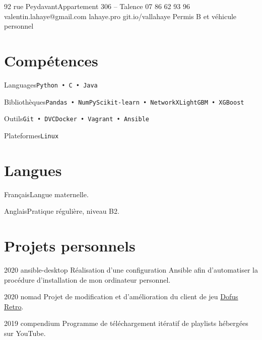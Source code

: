 \documentclass{tccv}
\begin{document}
\personal
    {92 rue Peydavant\newline Appartement 306 -- Talence}
    {07 86 62 93 96}
    {valentin.lahaye@gmail.com}
    {lahaye.pro}
    {git.io/vallahaye}
    {Permis B et véhicule personnel}

\section{Compétences}
\begin{factlist}

\item{Languages}{\texttt{Python • C • Java}}

\item{Bibliothèques}{\texttt{Pandas • NumPy}\newline\texttt{Scikit-learn • NetworkX}\newline\texttt{LightGBM • XGBoost}}

\item{Outils}{\texttt{Git • DVC}\newline\texttt{Docker • Vagrant • Ansible}}

\item{Plateformes}{\texttt{Linux}}

\end{factlist}

\section{Langues}
\begin{factlist}

\item{Français}{Langue maternelle.}

\item{Anglais}{Pratique régulière, niveau B2.}

\end{factlist}

\section{Projets personnels}
\begin{yearlist}

\item{2020}
    {ansible-desktop \href{https://github.com/vallahaye/ansible-desktop}{\scriptsize\faExternalLink}}
    {Réalisation d'une configuration Ansible afin d'automatiser la procédure d'installation de mon ordinateur personnel.}

\item{2020}
    {nomad \href{https://gitlab.com/emurub/nomad}{\scriptsize\faExternalLink}}
    {Projet de modification et d'amélioration du client de jeu
    \href{https://www.dofus.com/fr/plus-dofus/dofus-retro}{Dofus Retro}.}

\item{2019}
    {compendium \href{https://github.com/vallahaye/compendium}{\scriptsize\faExternalLink}}
    {Programme de téléchargement itératif de playlists hébergées sur YouTube.}

\end{yearlist}
\end{document}
